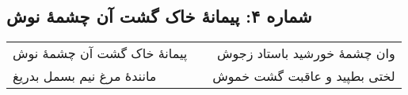 \begin{center}
\section*{شماره ۴: پیمانۀ خاک گشت آن چشمۀ نوش}
\label{sec:004}
\begin{longtable}{l p{0.5cm} r}
پیمانهٔ خاک گشت آن چشمهٔ نوش
&&
وان چشمهٔ خورشید باستاد زجوش
\\
مانندهٔ مرغ نیم بسمل بدریغ
&&
لختی بطپید و عاقبت گشت خموش
\\
\end{longtable}
\end{center}
